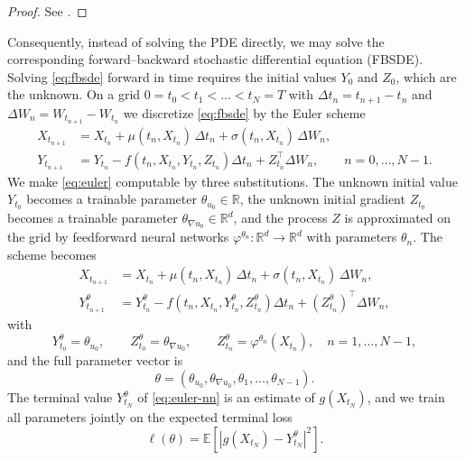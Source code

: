 ﻿\documentclass[10pt,a4paper]{article}
\begin{document}
\begin{proof}
See \cite{ElKarouiPengQuenez1997}.
\end{proof}
Consequently, instead of solving the PDE directly, we may solve the
corresponding forward--backward stochastic differential equation
(FBSDE). Solving \eqref{eq:fbsde} forward in time requires the initial values $Y_0$ and $Z_0$, which are the unknown. On a grid $0=t_0<t_1<\dots<t_N=T$ with $\Delta t_n = t_{n+1}-t_n$ and $\Delta W_n = W_{t_{n+1}}-W_{t_n}$ we discretize \eqref{eq:fbsde} by the Euler scheme
\begin{align}
X_{t_{n+1}} &= X_{t_n} + \mu(t_n,X_{t_n})\,\Delta t_n
+ \sigma(t_n,X_{t_n})\,\Delta W_n, \nonumber\\
Y_{t_{n+1}} &= Y_{t_n} - f\!\left(t_n,X_{t_n},Y_{t_n},Z_{t_n}\right)
\Delta t_n + Z_{t_n}^{\top}\Delta W_n,
\qquad n = 0,\dots,N-1.
\label{eq:euler}
\end{align}
We make \eqref{eq:euler} computable by three substitutions. The unknown initial value $Y_{t_0}$ becomes a trainable parameter $\theta_{u_0}\in\mathbb R$, the unknown initial gradient $Z_{t_0}$ becomes a trainable parameter $\theta_{\nabla u_0}\in\mathbb R^d$, and the process $Z$ is approximated on the grid by feedforward neural networks $\varphi^{\theta_n}\colon\mathbb R^d\to\mathbb R^d$ with parameters $\theta_n$. The scheme becomes
\begin{align}
X_{t_{n+1}} &= X_{t_n} + \mu(t_n,X_{t_n})\,\Delta t_n
+ \sigma(t_n,X_{t_n})\,\Delta W_n, \nonumber\\
Y^{\theta}_{t_{n+1}} &= Y^{\theta}_{t_n}
- f\!\left(t_n,X_{t_n},Y^{\theta}_{t_n},Z^{\theta}_{t_n}\right)\Delta t_n
+ \left(Z^{\theta}_{t_n}\right)^{\top}\Delta W_n,
\label{eq:euler-nn}
\end{align}
with
\begin{equation}
Y^{\theta}_{t_0} = \theta_{u_0},
\qquad
Z^{\theta}_{t_0} = \theta_{\nabla u_0},
\qquad
Z^{\theta}_{t_n} = \varphi^{\theta_n}(X_{t_n}),
\quad n = 1,\dots,N-1,
\end{equation}
and the full parameter vector is
\begin{equation}
\theta = \left(\theta_{u_0},\theta_{\nabla u_0},
\theta_1,\dots,\theta_{N-1}\right).
\end{equation}
The terminal value $Y^{\theta}_{t_N}$ of \eqref{eq:euler-nn} is an estimate of $g(X_{t_N})$, and we train all parameters jointly on the expected terminal loss
\begin{equation*}
\ell(\theta)
= \mathbb E\left[\left|g(X_{t_N}) - Y^{\theta}_{t_N}\right|^2\right].
\end{equation*}
\end{document}
